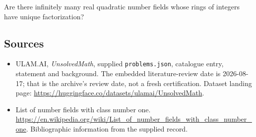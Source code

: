 \documentclass[11pt,a4paper]{article}
\begin{document}
Are there infinitely many real quadratic number fields whose rings of integers have unique factorization?

\subsection{Sources}

{\small

\begin{itemize}

\item[\hypertarget{source:statement:1}{S1}] ULAM.AI, \emph{UnsolvedMath}, supplied \texttt{problems.json}, catalogue entry, statement and background. The embedded literature-review date is 2026-08-17; that is the archive’s review date, not a fresh certification. Dataset landing page: \url{https://huggingface.co/datasets/ulamai/UnsolvedMath}.

\item[\hypertarget{source:statement:2}{S2}] List of number fields with class number one. \url{https://en.wikipedia.org/wiki/List_of_number_fields_with_class_number_one}. Bibliographic information from the supplied record.

\end{itemize}

}

\label{end:statement}
\end{document}
